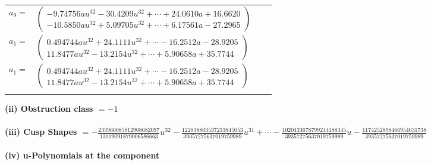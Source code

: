 \documentclass[1p]{elsarticle_modified}
\theoremstyle{definition}
\begin{document}
\begin{tabular}{m{7pt} m{180pt} m{7pt} m{180pt} }
\flushright $a_{9}=$&$\begin{pmatrix}-9.74756 a u^{32}-30.4209 u^{32}+\cdots+24.0610 a+16.6620\\-10.5850 a u^{32}+5.09705 u^{32}+\cdots+6.17561 a-27.2965\end{pmatrix}$ \\
\flushright $a_{1}=$&$\begin{pmatrix}0.494744 a u^{32}+24.1111 u^{32}+\cdots-16.2512 a-28.9205\\11.8477 a u^{32}-13.2154 u^{32}+\cdots+5.90658 a+35.7744\end{pmatrix}$\\ \flushright $a_{1}=$&$\begin{pmatrix}0.494744 a u^{32}+24.1111 u^{32}+\cdots-16.2512 a-28.9205\\11.8477 a u^{32}-13.2154 u^{32}+\cdots+5.90658 a+35.7744\end{pmatrix}$\\&\end{tabular}
\flushleft \textbf{(ii) Obstruction class $= -1$}\\~\\
\flushleft \textbf{(iii) Cusp Shapes $= -\frac{233960085812908682097}{13119091879006586663} u^{32}-\frac{122838803537233845053}{39357275637019759989} u^{31}+\cdots-\frac{1020433678799244188345}{39357275637019759989} u-\frac{1174252898466954031738}{39357275637019759989}$}\\~\\
\newpage\renewcommand{\arraystretch}{1}
\flushleft \textbf{(iv) u-Polynomials at the component}\newline \\
\end{document}
